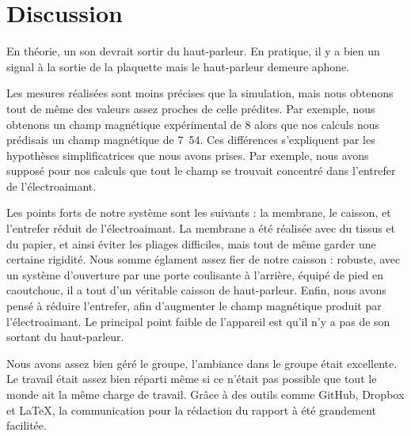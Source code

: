 

\section{Discussion}

En théorie, un son devrait sortir du haut-parleur.  En pratique, il y a bien un signal
à la sortie de la plaquette mais le haut-parleur demeure aphone. 

Les mesures réalisées sont moins précises que la simulation, mais nous obtenons tout de même 
des valeurs assez proches de celle prédites.  Par exemple, nous obtenons un champ magnétique
expérimental de \unit{8}{\centi\tesla} alors que nos calculs nous prédisais un champ magnétique de
\unit{7.54}{\centi\tesla}. Ces différences s'expliquent par les hypothèses simplificatrices
que nous avons prises. Par exemple, nous avons supposé pour nos calculs que tout le champ se trouvait 
concentré dans l'entrefer de l'électroaimant.

Les points forts de notre système sont les suivants : la membrane, le caisson, et l'entrefer réduit de l'électroaimant. 
La membrane a été réalisée avec du tissus et du papier, et ainsi éviter les pliages difficiles, mais tout de même garder 
une certaine rigidité. Nous somme églament assez fier de notre caisson : robuste, avec un système d'ouverture par une porte
coulisante à l'arrière, équipé de pied en caoutchouc, il a tout d'un véritable caisson de haut-parleur. Enfin, nous avons 
pensé à réduire l'entrefer, afin d'augmenter le champ magnétique produit par l'électroaimant. Le principal point faible de 
l'appareil est qu'il n'y a pas de son sortant du haut-parleur.

Nous avons assez bien géré le groupe, l'ambiance dans le groupe était excellente. Le travail était assez bien réparti
même si ce n'était pas possible que tout le monde ait la même charge de travail. Grâce à des outils comme GitHub, Dropbox et 
LaTeX, la communication pour la rédaction du rapport à été grandement facilitée.


